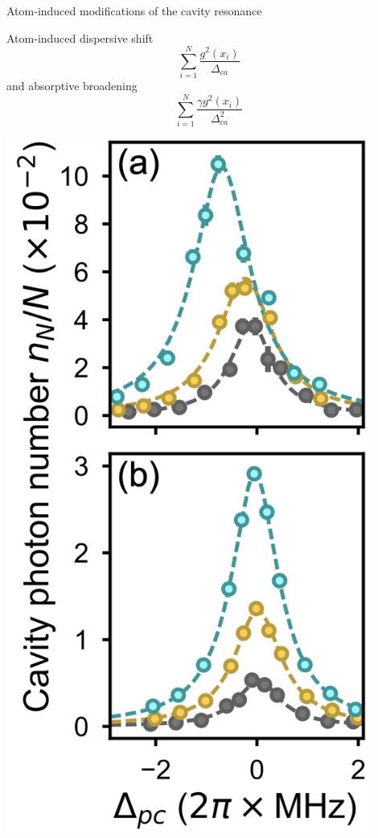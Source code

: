 \documentclass{beamer}
\begin{document}
\begin{frame}{Atom-induced modifications of the cavity resonance}
	\begin{minipage}{0.38\textwidth}
		Atom-induced dispersive shift
		\begin{equation*}
			\sum_{i=1}^N \frac{g^2(x_i)}{\Delta_{ca}}
		\end{equation*}
		and absorptive broadening
		\begin{equation*}
			\sum_{i=1}^N\frac{\gamma g^2(x_i)}{\Delta^2_{ca}}
		\end{equation*}
	\end{minipage}
	\hfill
	\begin{minipage}{0.61\textwidth}
		\hspace{1.7em}
		\begin{minipage}{0.47\textwidth}
			\includegraphics[width=0.9\textwidth]{Figure_4a.png}

\end{minipage}
\end{minipage}
\end{frame}
\end{document}
